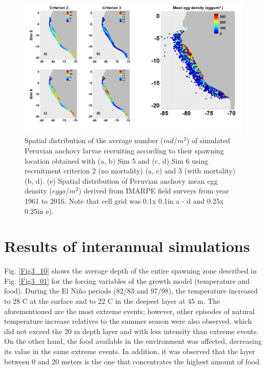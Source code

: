\begin{figure}[ht]
	\includegraphics[width=1.0\textwidth]{figures/Fig3_09.png}
	\centering
	\caption{Spatial distribution of the average number ($ind/m^2$) of simulated Peruvian anchovy larvae recruiting according to their spawning location obtained with (a, b) Sim 5 and (c, d) Sim 6 using recruitment criterion 2 (no mortality) (a, c) and 3 (with mortality) (b, d). (e) Spatial distribution of Peruvian anchovy mean egg density ($eggs/m^2$) derived from IMARPE field surveys from year 1961 to 2016. Note that cell grid was 0.1\textdegree x 0.1\textdegree in a - d and 0.25\textdegree x 0.25\textdegree in e).}
	\label{Fig3_09}
\end{figure}

\section{Results of interannual simulations}\label{Chap3Resu2}

Fig. \ref{Fig3_10} shows the average depth of the entire spawning zone described in Fig. \ref{Fig3_01} for the forcing variables of the growth model (temperature and food). During the El Niño periods (82/83 and 97/98), the temperature increased to 28 \textdegree C at the surface and to 22 \textdegree C in the deepest layer at 45 m. The aforementioned are the most extreme events; however, other episodes of natural temperature increase relatives to the summer season were also observed, which did not exceed the 20 m depth layer and with less intensity than extreme events. On the other hand, the food available in the environment was affected, decreasing its value in the same extreme events. In addition, it was observed that the layer between 0 and 20 meters is the one that concentrates the highest amount of food.\\

